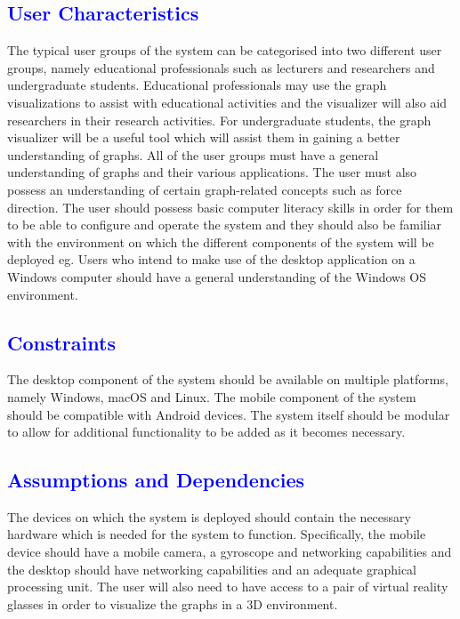\documentclass[12pt]{article}
\begin{document}
\textcolor{blue}{\subsection{User Characteristics}}
\begin{flushleft}
The typical user groups of the system can be categorised into two different user groups, namely educational professionals such as lecturers and researchers and undergraduate students. Educational professionals may use the graph visualizations to assist with educational activities and the visualizer will also aid researchers in their research activities. For undergraduate students, the graph visualizer will be a useful tool which will assist them in gaining a better understanding of graphs. All of the user groups must have a general understanding of graphs and their various applications. The user must also possess an understanding of certain graph-related concepts such as force direction. The user should possess basic computer literacy skills in order for them to be able to configure and operate the system and they should also be familiar with the environment on which the different components of the system will be deployed eg. Users who intend to make use of the desktop application on a Windows computer should have a general understanding of the Windows OS environment. 
\end{flushleft}

\textcolor{blue}{\subsection{Constraints}}
\begin{flushleft}
The desktop component of the system should be available on multiple platforms, namely Windows, macOS and Linux. The mobile component of the system should be compatible with Android devices. The system itself should be modular to allow for additional functionality to be added as it becomes necessary. 
\end{flushleft}

\textcolor{blue}{\subsection{Assumptions and Dependencies}}
\begin{flushleft}
The devices on which the system is deployed should contain the necessary hardware which is needed for the system to function. Specifically, the mobile device should have a mobile camera, a gyroscope and networking capabilities and the desktop should have networking capabilities and an adequate graphical processing unit. The user will also need to have access to a pair of virtual reality glasses in order to visualize the graphs in a 3D environment.
\end{flushleft}
\end{document}
